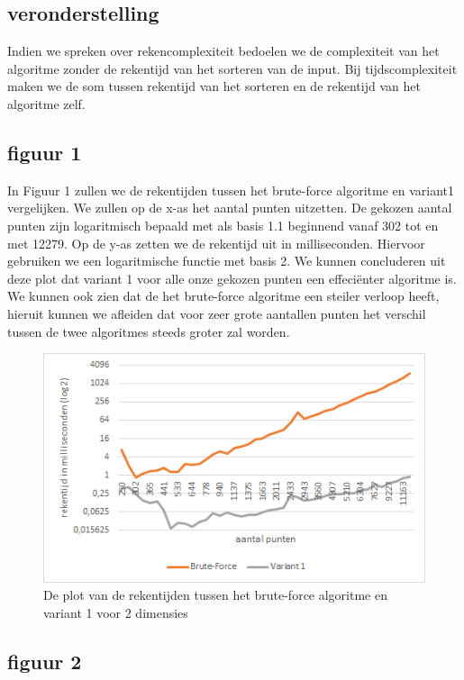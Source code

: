 \documentclass[12pt]{article}
\begin{document}
\subsection{veronderstelling}
Indien we spreken over rekencomplexiteit bedoelen we de complexiteit van het algoritme zonder de rekentijd van het sorteren van de input.
Bij tijdscomplexiteit maken we de som tussen rekentijd van het sorteren en de rekentijd van het algoritme zelf.

\subsection{figuur 1}
In Figuur 1 zullen we de rekentijden tussen het brute-force algoritme en variant1 vergelijken.
We zullen op de x-as het aantal punten uitzetten.
De gekozen aantal punten zijn logaritmisch bepaald met als basis 1.1 beginnend vanaf 302 tot en met 12279.
Op de y-as zetten we de rekentijd uit in milliseconden. Hiervoor gebruiken we een logaritmische functie met basis 2.
We kunnen concluderen uit deze plot dat variant 1 voor alle onze gekozen punten een effeciënter algoritme is.
We kunnen ook zien dat de het brute-force algoritme een steiler verloop heeft, hieruit kunnen we afleiden dat voor zeer grote aantallen punten het verschil tussen de twee algoritmes steeds groter zal worden.

\begin{figure}
\includegraphics[width=\textwidth]{Simpel-var1-rekentijd.png}
\caption{De plot van de rekentijden tussen het brute-force algoritme en variant 1 voor 2 dimensies}
\end{figure}

\subsection{figuur 2}
\end{document}
